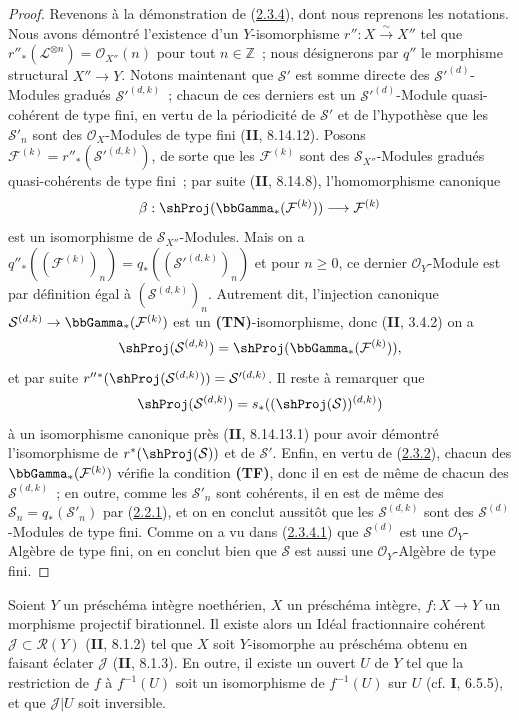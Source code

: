 \begin{proof}
Revenons à la démonstration de
(\hyperref[III.2.3.4-fr]{2.3.4}), dont nous reprenons les notations. Nous
avons démontré l'existence d'un $Y$-isomorphisme $r'':X\xrightarrow{\sim}X''$
tel que $r''_*(\mathcal L^{\otimes n})=\mathcal O_{X''}(n)$ pour tout
$n\in\mathbb Z$~; nous désignerons par $q''$ le morphisme structural
$X''\to Y$. Notons maintenant que $\mathcal S'$ est somme directe des
$\mathcal S'^{(d)}$-Modules gradués $\mathcal S'^{(d,k)}$~; chacun de ces
derniers est un $\mathcal S'^{(d)}$-Module quasi-cohérent de type fini, en
vertu de la périodicité de $\mathcal S'$ et de l'hypothèse que les
$\mathcal S'_n$ sont des $\mathcal O_X$-Modules de type fini
(\textbf{II}, 8.14.12). Posons
$\mathcal F^{(k)}=r''_*(\mathcal S'^{(d,k)})$, de sorte que les
$\mathcal F^{(k)}$ sont des $\mathcal S_{X''}$-Modules gradués
quasi-cohérents de type fini~; par suite (\textbf{II}, 8.14.8), l'homomorphisme
canonique
\[
\beta:\shProj(\bbGamma_*(\mathcal F^{(k)}))
\longrightarrow\mathcal F^{(k)}
\]
est un isomorphisme de $\mathcal S_{X''}$-Modules. Mais on a
$q''_*((\mathcal F^{(k)})_n)=q_*((\mathcal S'^{(d,k)})_n)$ et pour
$n\geq0$, ce dernier $\mathcal O_Y$-Module est par définition égal à
$(\mathcal S^{(d,k)})_n$. Autrement dit, l'injection canonique
$\mathcal S^{(d,k)}\to\bbGamma_*(\mathcal F^{(k)})$ est un
\textbf{(TN)}-isomorphisme, donc (\textbf{II}, 3.4.2) on a
\[
\shProj(\mathcal S^{(d,k)})
=\shProj(\bbGamma_*(\mathcal F^{(k)})),
\]
et par suite
$r''{}^*(\shProj(\mathcal S^{(d,k)}))=\mathcal S'^{(d,k)}$.
Il reste à remarquer que
\[
\shProj(\mathcal S^{(d,k)})
=s_*((\shProj(\mathcal S))^{(d,k)})
\]
à un isomorphisme canonique près (\textbf{II}, 8.14.13.1) pour avoir démontré l'isomorphisme de
$r^*(\shProj(\mathcal S))$ et de $\mathcal S'$.
Enfin, en vertu de (\hyperref[III.2.3.2-fr]{2.3.2}), chacun des
$\bbGamma_*(\mathcal F^{(k)})$ vérifie la condition \textbf{(TF)}, donc il
en est de même de chacun des $\mathcal S^{(d,k)}$~; en outre, comme les $\mathcal S'_n$
sont cohérents, il en est de même des $\mathcal S_n=q_*(\mathcal S'_n)$ par
(\hyperref[III.2.2.1-fr]{2.2.1}), et on en conclut aussitôt que les $\mathcal S^{(d,k)}$ sont des
$\mathcal S^{(d)}$-Modules de type fini. Comme on a vu dans
(\hyperref[III.2.3.4.1-fr]{2.3.4.1}) que $\mathcal S^{(d)}$ est une
$\mathcal O_Y$-Algèbre de type fini, on en conclut bien que $\mathcal S$ est aussi une
$\mathcal O_Y$-Algèbre de type fini.
\end{proof}

\begin{proposition}[2.3.5]
\label{III.2.3.5-fr}
Soient $Y$ un préschéma intègre noethérien, $X$ un préschéma intègre,
$f:X\to Y$ un morphisme \textup{projectif birationnel}. Il existe alors un Idéal
fractionnaire cohérent $\mathcal J\subset\mathcal R(Y)$ \textup{(\textbf{II}, 8.1.2)} tel
que $X$ soit $Y$-isomorphe au préschéma obtenu en faisant éclater
$\mathcal J$ \textup{(\textbf{II}, 8.1.3)}. En outre, il existe un ouvert $U$ de $Y$ tel que
la restriction de $f$ à $f^{-1}(U)$ soit un isomorphisme de $f^{-1}(U)$
sur $U$ \textup{(cf. \textbf{I}, 6.5.5)}, et que $\mathcal J|U$ soit inversible.
\end{proposition}

